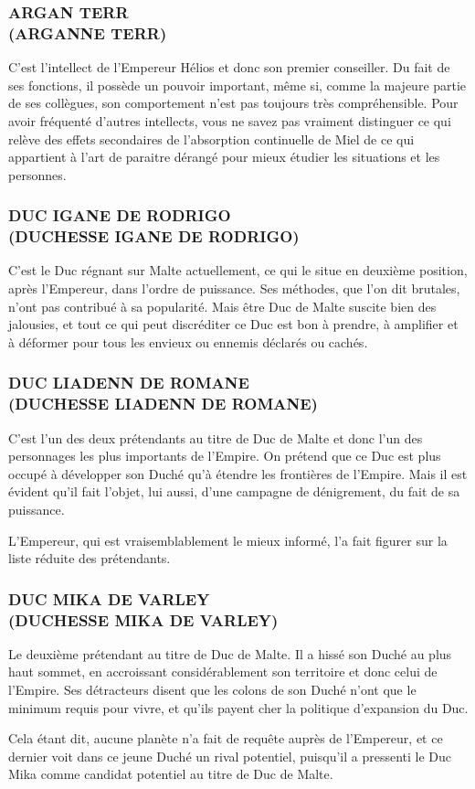 \documentclass[14pt,twocolumn]{extarticle}
\begin{document}
\subsubsection{ARGAN TERR\\(ARGANNE TERR)}

C'est l'intellect de l'Empereur Hélios et donc son premier conseiller. Du fait
de ses fonctions, il possède un pouvoir important, même si, comme la majeure
partie de ses collègues, son comportement n'est pas toujours très
compréhensible. Pour avoir fréquenté d'autres intellects, vous ne savez pas
vraiment distinguer ce qui relève des effets secondaires de l'absorption
continuelle de Miel de ce qui appartient à l'art de paraitre dérangé pour mieux
étudier les situations et les personnes.

\subsubsection{DUC IGANE DE RODRIGO\\(DUCHESSE IGANE DE RODRIGO)}

C'est le Duc régnant sur Malte actuellement, ce qui le situe en deuxième
position, après l'Empereur, dans l'ordre de puissance. Ses méthodes, que l'on
dit brutales, n'ont pas contribué à sa popularité. Mais être Duc de Malte
suscite bien des jalousies, et tout ce qui peut discréditer ce Duc est bon à
prendre, à amplifier et à déformer pour tous les envieux ou ennemis déclarés ou
cachés.

\subsubsection{DUC LIADENN DE ROMANE\\(DUCHESSE LIADENN DE ROMANE)}

C'est l'un des deux prétendants au titre de Duc de Malte et donc l'un des
personnages les plus importants de l'Empire. On prétend que ce Duc est plus
occupé à développer son Duché qu'à étendre les frontières de l'Empire. Mais il
est évident qu'il fait l'objet, lui aussi, d'une campagne de dénigrement, du
fait de sa puissance.

L'Empereur, qui est vraisemblablement le mieux informé, l'a fait figurer sur la
liste réduite des prétendants.

\subsubsection{DUC MIKA DE VARLEY\\(DUCHESSE MIKA DE VARLEY)}

Le deuxième prétendant au titre de Duc de Malte. Il a hissé son Duché au plus
haut sommet, en accroissant considérablement son territoire et donc celui de
l'Empire. Ses détracteurs disent que les colons de son Duché n'ont que le
minimum requis pour vivre, et qu'ils payent cher la politique d'expansion du
Duc.

Cela étant dit, aucune planète n'a fait de requête auprès de l'Empereur, et ce
dernier voit dans ce jeune Duché un rival potentiel, puisqu'il a pressenti le
Duc Mika comme candidat potentiel au titre de Duc de Malte.
\end{document}
